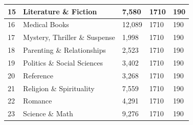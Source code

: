 \documentclass[12pt]{article}
\numberwithin{equation}{section}
\numberwithin{figure}{section}
\begin{document}
\begin{table}[]
\begin{tabular}{|l|l|l|l|l|}
	15             & Literature \& Fiction         & 7,580                                                          & 1710                                                                            & 190                                                                         \\ \hline
	16             & Medical Books                 & 12,089                                                         & 1710                                                                            & 190                                                                         \\ \hline
	17             & Mystery, Thriller \& Suspense & 1,998                                                          & 1710                                                                            & 190                                                                         \\ \hline
	18             & Parenting \& Relationships    & 2,523                                                          & 1710                                                                            & 190                                                                         \\ \hline
	19             & Politics \& Social Sciences   & 3,402                                                          & 1710                                                                            & 190                                                                         \\ \hline
	20             & Reference                     & 3,268                                                          & 1710                                                                            & 190                                                                         \\ \hline
	21             & Religion \& Spirituality      & 7,559                                                          & 1710                                                                            & 190                                                                         \\ \hline
	22             & Romance                       & 4,291                                                          & 1710                                                                            & 190                                                                         \\ \hline
	23             & Science \& Math               & 9,276                                                          & 1710                                                                            & 190                                                                         \\ \hline

\end{tabular}
\end{table}
\end{document}
